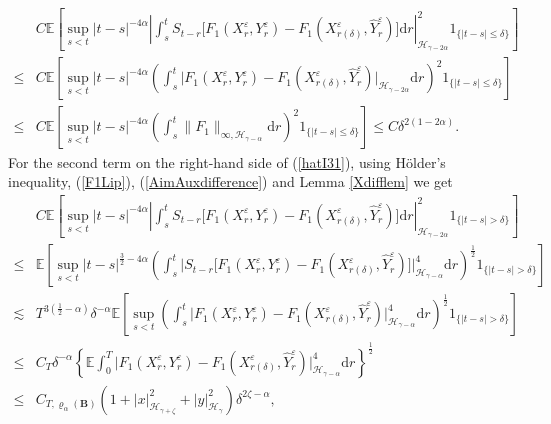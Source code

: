 \documentclass[10pt,a4paper]{article}
\numberwithin{equation}{section}
\begin{document}
\begin{align}\label{tilK1}
	& C   \mathbb E \left [ \sup_{s<t} |t-s|^{-4\alpha} \left| \int_s^t S_{t-r}\big[ F_1(X_r^\varepsilon,Y_r^\varepsilon)-F_1(X_{r(\delta)}^\varepsilon,\hat{Y}_r^\varepsilon) \big]\mathrm{d} r \right|_{\mathcal H_{\gamma-2\alpha} }^2  1_{ \{|t-s|\leq \delta\}}\right ] \nonumber\\
  \leq  &C \mathbb E  \left [ \sup_{s<t} |t-s|^{-4\alpha} \left( \int_s^t \big| F_1(X_r^\varepsilon,Y_r^\varepsilon)-F_1(X_{r(\delta)}^\varepsilon,\hat{Y}_r^\varepsilon) \big|_{\mathcal H_{\gamma-2\alpha} } \mathrm{d} r \right)^2 1_{ \{|t-s|\leq \delta\}}\right ] \nonumber\\
 \leq & C \mathbb E \left [ \sup_{s<t} |t-s|^{-4\alpha} \left( \int_s^t \|F_1\|_{\infty, \mathcal H_{\gamma-\alpha}}  \mathrm{d} r \right)^2 1_{ \{|t-s|\leq \delta\}}\right ]
\leq C \delta^{2(1-2\alpha)}.
\end{align}
For the second term on the right-hand side of (\ref{hatI31}), using H\"{o}lder's inequality, (\ref{F1Lip}), (\ref{AimAuxdifference}) and Lemma \ref{Xdifflem} we get
\begin{align}\label{K12}
& C   \mathbb E \left [ \sup_{s<t} |t-s|^{-4\alpha} \left| \int_s^t S_{t-r}\big[ F_1(X_r^\varepsilon,Y_r^\varepsilon)-F_1(X_{r(\delta)}^\varepsilon,\hat{Y}_r^\varepsilon) \big]\mathrm{d} r \right|_{\mathcal H_{\gamma-2\alpha} }^2  1_{ \{|t-s| >\delta\}}\right ] \nonumber\\
\leq & \mathbb E \left [ \sup_{s<t} |t-s|^{\frac 32-4\alpha}  \left(\int_s^t \big|S_{t-r}\big[F_1(X_r^\varepsilon,Y_r^\varepsilon)-F_1(X_{r(\delta)}^\varepsilon,\hat{Y}_r^\varepsilon) \big] \big|_{\mathcal H_{\gamma-\alpha} }^4 \mathrm{d} r \right)^{\frac 12}  1_{ \{|t-s|> \delta\} } \right] \nonumber\\
	 \lesssim &  T^{3(\frac 12-\alpha)} \delta^{-\alpha} \mathbb E \left[ \sup_{s<t} \left(\int_s^t \big|F_1(X_r^\varepsilon,Y_r^\varepsilon)-F_1(X_{r(\delta)}^\varepsilon,\hat{Y}_r^\varepsilon)  \big|_{\mathcal H_{\gamma-\alpha} }^4 \mathrm{d} r \right)^{\frac 12}  1_{ \{|t-s|> \delta\} }  \right] \nonumber\\
	\leq  &C_T \delta^{-\alpha} \left\{ \mathbb E \int_0^T \big|F_1(X_r^\varepsilon,Y_r^\varepsilon)-F_1(X_{r(\delta)}^\varepsilon,\hat{Y}_r^\varepsilon)  \big|_{\mathcal H_{\gamma-\alpha} }^4 \mathrm{d} r \right \}^{\frac 12} \nonumber\\
	 \leq  & C_{T,\varrho_{\alpha}(\mathbf{B})} (1+|x|_{\mathcal{H}_{\gamma+\zeta}}^2+|y|_{\mathcal{H}_\gamma}^2)\delta^{2\zeta-\alpha},
\end{align}
\end{document}
